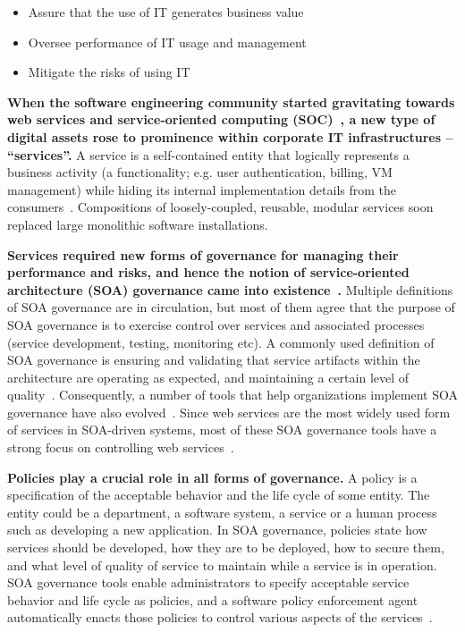 \begin{itemize}
\item Assure that the use of IT generates business value
\item Oversee performance of IT usage and management
\item Mitigate the risks of using IT
\end{itemize}

\textbf{When the software engineering community started gravitating towards web services and
service-oriented computing (SOC)~\cite{1254461, what-is-soa, Haines:2010:SAM:1787234.1787269}, 
a new type of digital assets rose to prominence within corporate IT 
infrastructures -- ``services''.} A service is a self-contained entity that logically represents a
business activity (a functionality; e.g. user authentication, billing, VM management) 
while hiding its internal implementation details from the consumers~\cite{what-is-soa}. 
Compositions of loosely-coupled, reusable, modular services soon replaced 
large monolithic software installations. 

\textbf{Services required new forms of governance for managing their performance
and risks, and hence the notion of service-oriented architecture (SOA) governance 
came into existence~\cite{gartner-soa-gov,soagov}.} 
Multiple definitions of SOA governance
are in circulation, but most of them agree that the purpose of SOA governance is to exercise control over
services and associated processes (service development, testing, monitoring etc). A commonly used definition
of SOA governance is ensuring and validating that service artifacts within the architecture are operating
as expected, and maintaining a certain level of quality~\cite{gartner-soa-gov}.
Consequently, a number of tools that help organizations implement SOA governance 
have also evolved~\cite{Schepers:2008:LAS:1363686.1363932,4730489,6478236,5577268}.
Since web services are the most widely used form of services in SOA-driven systems, most of these
SOA governance tools have a strong focus on controlling web services~\cite{6094008}. 

\textbf{Policies play a crucial role in all forms of governance.} A policy is a specification of the acceptable behavior
and the life cycle of some entity. The entity could be a department, a software system, a service or a 
human process such as developing
a new application. In SOA governance, policies state how services should be developed, how they are to be
deployed, how to secure them, and what level of quality of service to maintain while a service is in operation.
SOA governance tools enable administrators to specify acceptable service behavior and life cycle as policies, and
a software policy enforcement agent automatically enacts those policies to control various aspects of the 
services~\cite{5976827,4483228,4279691}. 

